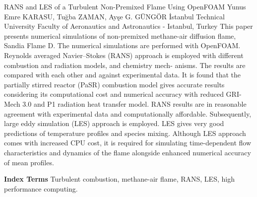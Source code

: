
    \begin{abstract_online}{RANS and LES of a Turbulent Non-Premixed Flame Using OpenFOAM}{%
        Yunus Emre KARASU, Tuğba ZAMAN, Ayşe G. GÜNGÖR}{%
        }{%
        İstanbul Technical University Faculty of Aeronautics and Astronautics - Istanbul, Turkey}
    This paper presents numerical simulations of non-premixed methane-air diffusion flame, Sandia Flame D. The numerical simulations are performed with OpenFOAM. Reynolds averaged Navier–Stokes (RANS) approach is employed with different combustion and radiation models, and chemistry mech- anisms. The results are compared with each other and against experimental data. It is found that the partially stirred reactor (PaSR) combustion model gives accurate results considering its computational cost and numerical accuracy with reduced GRI-Mech 3.0 and P1 radiation heat transfer model. RANS results are in reasonable agreement with experimental data and computationally affordable. Subsequently, large eddy simulation (LES) approach is employed. LES gives very good predictions of temperature profiles and species mixing. Although LES approach comes with increased CPU cost, it is required for simulating time-dependent flow characteristics and dynamics of the flame alongside enhanced numerical accuracy of mean profiles. 
    
            \textbf{Index Terms} \newline{}Turbulent combustion, methane-air flame, RANS, LES, high performance computing.
    \end{abstract_online}
    